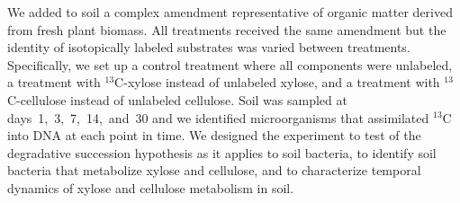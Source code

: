 We added to soil a complex amendment representative of organic
matter derived from fresh plant biomass. All treatments received the same
amendment but the identity of isotopically labeled substrates was varied
between treatments. Specifically, we set up a control treatment where all
components were unlabeled, a treatment with $^{13}$C-xylose instead of
unlabeled xylose, and a treatment with $^{13}$C-cellulose instead of unlabeled
cellulose. Soil was sampled at days~1,~3,~7,~14,~and~30 and we identified
microorganisms that assimilated $^{13}$C into DNA at each point in time. We
designed the experiment to test of the degradative succession
hypothesis as it applies to soil bacteria, to identify soil bacteria that
metabolize xylose and cellulose, and to characterize temporal dynamics of
xylose and cellulose metabolism in soil. 
